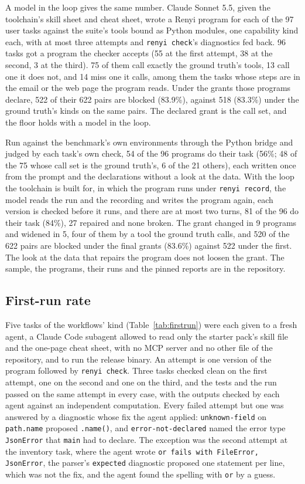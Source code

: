 \documentclass[11pt]{article}
\begin{document}
A model in the loop gives the same number. Claude Sonnet 5.5, given the
toolchain's skill sheet and cheat sheet, wrote a Renyi program for each
of the 97 user tasks against the suite's tools bound as Python modules,
one capability kind each, with at most three attempts and \texttt{renyi
check}'s diagnostics fed back. 96 tasks got a program the checker
accepts (55 at the first attempt, 38 at the second, 3 at the third). 75
of them call exactly the ground truth's tools, 13 call one it does not,
and 14 miss one it calls, among them the tasks whose steps are in the
email or the web page the program reads. Under the grants those
programs declare, 522 of their 622 pairs are blocked (83.9\%), against
518 (83.3\%) under the ground truth's kinds on the same pairs. The
declared grant is the call set, and the floor holds with a model in the
loop.

Run against the benchmark's own environments through the Python bridge
and judged by each task's own check, 54 of the 96 programs do their
task (56\%; 48 of the 75 whose call set is the ground truth's, 6 of the
21 others), each written once from the prompt and the declarations
without a look at the data. With the loop the toolchain is built for,
in which the program runs under \texttt{renyi record}, the model reads
the run and the recording and writes the program again, each version
is checked before it runs, and there are at most two turns, 81 of the
96 do their task (84\%), 27 repaired and none broken. The grant changed
in 9 programs and widened in 5, four of them by a tool the ground truth
calls, and 520 of the 622 pairs are blocked under the final grants
(83.6\%) against 522 under the first. The look at the data that repairs
the program does not loosen the grant. The sample, the programs, their
runs and the pinned reports are in the repository.

\subsection{First-run rate}

Five tasks of the workflows' kind (Table~\ref{tab:firstrun}) were each
given to a fresh agent, a Claude Code subagent allowed to read only the
starter pack's skill file and the one-page cheat sheet, with no MCP
server and no other file of the repository, and to run the release
binary. An attempt is one version of the program followed by
\texttt{renyi check}. Three tasks checked clean on the first attempt,
one on the second and one on the third, and the tests and the run
passed on the same attempt in every case, with the outputs checked by
each agent against an independent computation. Every failed attempt but
one was answered by a diagnostic whose fix the agent applied:
\texttt{unknown-field} on \texttt{path.name} proposed \texttt{.name()},
and \texttt{error-not-declared} named the error type \texttt{JsonError}
that \texttt{main} had to declare. The exception was the second attempt
at the inventory task, where the agent wrote \texttt{or fails with
FileError, JsonError}, the parser's \texttt{expected} diagnostic
proposed one statement per line, which was not the fix, and the agent
found the spelling with \texttt{or} by a guess.
\end{document}

